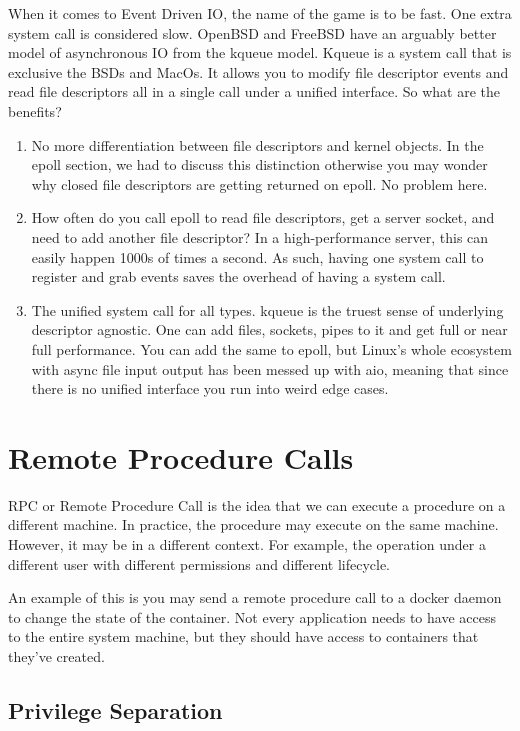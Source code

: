 When it comes to Event Driven IO, the name of the game is to be fast.
One extra system call is considered slow.
OpenBSD and FreeBSD have an arguably better model of asynchronous IO from the kqueue model.
Kqueue is a system call that is exclusive the BSDs and MacOs.
It allows you to modify file descriptor events and read file descriptors all in a single call under a unified interface.
So what are the benefits?

\begin{enumerate}
\item No more differentiation between file descriptors and kernel objects. In the epoll section, we had to discuss this distinction otherwise you may wonder why closed file descriptors are getting returned on epoll. No problem here.
\item How often do you call epoll to read file descriptors, get a server socket, and need to add another file descriptor?
  In a high-performance server, this can easily happen 1000s of times a second.
  As such, having one system call to register and grab events saves the overhead of having a system call.
\item The unified system call for all types.
  kqueue is the truest sense of underlying descriptor agnostic.
  One can add files, sockets, pipes to it and get full or near full performance.
  You can add the same to epoll, but Linux's whole ecosystem with async file input output has been messed up with aio, meaning that since there is no unified interface you run into weird edge cases.
\end{enumerate}


\section{Remote Procedure Calls}

RPC or Remote Procedure Call is the idea that we can execute a procedure on a different machine.
In practice, the procedure may execute on the same machine.
However, it may be in a different context.
For example, the operation under a different user with different permissions and different lifecycle.

An example of this is you may send a remote procedure call to a docker daemon to change the state of the container.
Not every application needs to have access to the entire system machine, but they should have access to containers that they've created.

\subsection{Privilege Separation}

